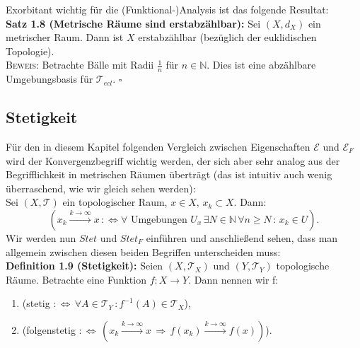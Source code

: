 \documentclass[11pt,english]{smfart}
\newcommand*{\QEDB}{\null\nobreak\hfill\ensuremath{\square}}
\begin{document}
Exorbitant wichtig für die (Funktional-)Analysis ist das folgende Resultat:\\[0.5cm]
\textbf{Satz 1.8 (Metrische Räume sind erstabzählbar):} Sei \((X,d_X)\) ein metrischer Raum. Dann ist \(X\) erstabzählbar (bezüglich der euklidischen Topologie).\\
\textsc{Beweis:} Betrachte Bälle mit Radii \(\frac{1}{n}\) für \(n \in \mathbb{N}\). Dies ist eine abzählbare Umgebungsbasis für \(\mathcal{T}_{ecl}\). \QEDB

\subsection{Stetigkeit}
Für den in diesem Kapitel folgenden Vergleich zwischen Eigenschaften \(\mathcal{E}\) und \(\mathcal{E}_F\) wird der Konvergenzbegriff wichtig werden, der sich aber sehr analog aus der Begrifflichkeit in metrischen Räumen überträgt (das ist intuitiv auch wenig überraschend, wie wir gleich sehen werden):\\
Sei \((X,\mathcal{T})\) ein topologischer Raum, \(x \in X, \, x_k \subset X\). Dann:
\begin{equation}
    (x_k \stackrel{k \to \infty}{\to} x \, :\Leftrightarrow \forall \text{ Umgebungen }U_x \, \exists N \in \mathbb{N} \, \forall n \geq N \, : \, x_k \in U).
\end{equation}
Wir werden nun \(Stet\) und \(Stet_F\) einführen und anschließend sehen, dass man allgemein zwischen diesen beiden Begriffen unterscheiden muss:\\[0.5cm]
\textbf{Definition 1.9 (Stetigkeit):} Seien \((X,\mathcal{T}_X)\) und \((Y,\mathcal{T}_Y)\) topologische Räume. Betrachte eine Funktion \(f : X \to Y\). Dann nennen wir f:
\begin{enumerate}
    \item (stetig \(:\Leftrightarrow \, \forall A \in \mathcal{T}_Y \, : f^{-1}(A) \in \mathcal{T}_X\)),
    \item (folgenstetig \(:\Leftrightarrow \, (x_k \stackrel{k \to \infty}{\to} x \, \Rightarrow \, f(x_k) \stackrel{k \to \infty}{\to} f(x))\)).
\end{enumerate}
\end{document}
